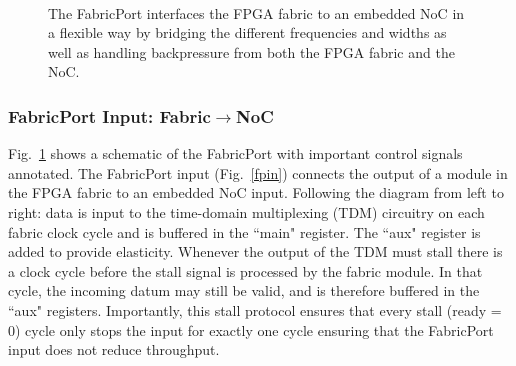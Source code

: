 \begin{figure}[t]
\centering
{}
 \\
\caption{The FabricPort interfaces the FPGA fabric to an embedded NoC in a flexible way by bridging the different frequencies and widths as well as handling backpressure from both the FPGA fabric and the NoC.}
\label{fabric_port}
\end{figure}

\subsubsection{FabricPort Input: Fabric$\rightarrow$NoC}

Fig.~\ref{fabric_port} shows a schematic of the FabricPort with important control signals annotated.
The FabricPort input (Fig.~\ref{fpin}) connects the output of a module in the FPGA fabric to an embedded NoC input.
Following the diagram from left to right: data is input to the time-domain multiplexing (TDM) circuitry on each fabric clock cycle and is buffered in the ``main" register.
The ``aux" register is added to provide elasticity. Whenever the output of the TDM must stall there is a clock cycle before the stall signal is processed by the fabric module.
In that cycle, the incoming datum may still be valid, and is therefore buffered in the ``aux" registers.
Importantly, this stall protocol ensures that every stall (ready = 0) cycle only stops the input for exactly one cycle ensuring that the FabricPort input does not reduce throughput.

